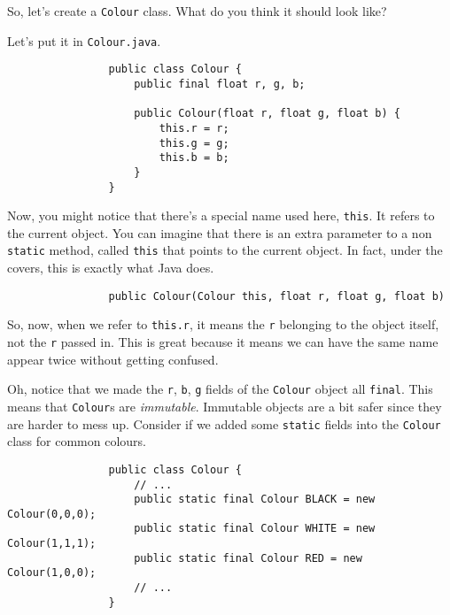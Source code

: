 \documentclass{article}
\begin{document}
            So, let's create a \texttt{Colour} class.  What do you think it should look like?
        
            Let's put it in \texttt{Colour.java}.  

            \begin{verbatim}
                public class Colour {
                    public final float r, g, b;
                
                    public Colour(float r, float g, float b) {
                        this.r = r;
                        this.g = g;
                        this.b = b;
                    }
                }
            \end{verbatim}
        
            Now, you might notice that there's a special name used here, \texttt{this}. It refers to the current object. You can imagine
            that there is an extra parameter to a non \texttt{static} method, called \texttt{this} that points to the current object. In
            fact, under the covers, this is exactly what Java does.

            \begin{verbatim}                
                public Colour(Colour this, float r, float g, float b)
            \end{verbatim}
        
            So, now, when we refer to \texttt{this.r}, it means the \texttt{r} belonging to the object itself, not the \texttt{r} passed in.
            This is great because it means we can have the same name appear twice without getting confused.
        
            Oh, notice that we made the \texttt{r}, \texttt{b}, \texttt{g} fields of the \texttt{Colour} object all \texttt{final}. This
            means that \texttt{Colour}s are \emph{immutable}. Immutable objects are a bit safer since they are harder to mess up. Consider
            if we added some \texttt{static} fields into the \texttt{Colour} class for common colours.
        
            \begin{verbatim}
                public class Colour {
                    // ...
                    public static final Colour BLACK = new Colour(0,0,0);
                    public static final Colour WHITE = new Colour(1,1,1);
                    public static final Colour RED = new Colour(1,0,0);
                    // ...
                }
            \end{verbatim}
        
\end{document}
